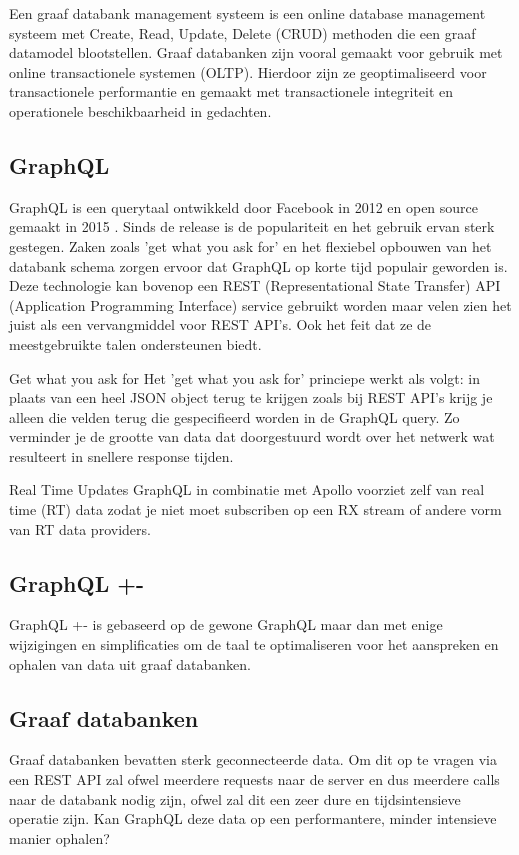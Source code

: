 Een graaf databank management systeem is een online database management systeem met Create, Read, Update, Delete (CRUD) methoden die een graaf datamodel blootstellen. Graaf databanken zijn vooral gemaakt voor gebruik met online transactionele systemen (OLTP). Hierdoor zijn ze geoptimaliseerd voor transactionele performantie en gemaakt met transactionele integriteit en operationele beschikbaarheid in gedachten.

\subsection{GraphQL}
 GraphQL is een querytaal ontwikkeld door Facebook in 2012 en open source gemaakt  in 2015 . Sinds de release is de populariteit en het gebruik ervan sterk gestegen. Zaken zoals 'get what you ask for' en het flexiebel opbouwen van het databank schema zorgen ervoor dat GraphQL op korte tijd populair geworden is. Deze technologie kan bovenop een REST (Representational State Transfer) API (Application Programming Interface) service gebruikt worden maar velen zien het juist als een vervangmiddel voor REST API's. Ook het feit dat ze de meestgebruikte talen ondersteunen biedt.
 
 Get what you ask for
 Het 'get what you ask for' princiepe werkt als volgt: in plaats van een heel JSON object terug te krijgen zoals bij REST API's krijg je alleen die velden terug die gespecifieerd worden in de GraphQL query. Zo verminder je de grootte van data dat doorgestuurd wordt over het netwerk wat resulteert in snellere response tijden.
 
 Real Time Updates
 GraphQL in combinatie met Apollo voorziet zelf van real time (RT) data zodat je niet moet subscriben op een RX stream of andere vorm van RT data providers.

\subsection{GraphQL +-}
GraphQL +- is gebaseerd op de gewone GraphQL maar dan met enige wijzigingen en simplificaties om de taal te optimaliseren voor het aanspreken en ophalen van data uit graaf databanken.

\subsection{Graaf databanken}
Graaf databanken bevatten sterk geconnecteerde data. Om dit op te vragen via een REST API zal ofwel meerdere requests naar de server en dus meerdere calls naar de databank nodig zijn, ofwel zal dit een zeer dure en tijdsintensieve operatie zijn. Kan GraphQL deze data op een performantere, minder intensieve manier ophalen? \autocite{graphDatabases}

